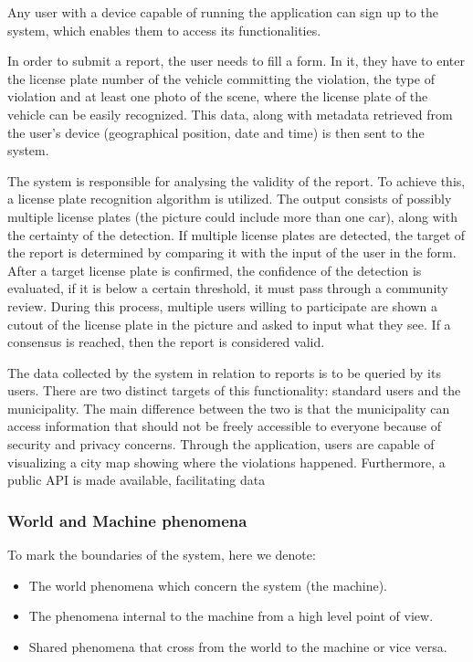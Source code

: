 Any user with a device capable of running the application can sign up to the system, which enables them to access its functionalities.

In order to submit a report, the user needs to fill a form. In it, they have to enter the license plate number of the vehicle committing the violation, the type of violation and at least one photo of the scene, where the license plate of the vehicle can be easily recognized. This data, along with metadata retrieved from the user's device (geographical position, date and time) is then sent to the system.

The system is responsible for analysing the validity of the report. To achieve this, a license plate recognition algorithm is utilized. The output consists of possibly multiple license plates (the picture could include more than one car), along with the certainty of the detection. If multiple license plates are detected, the target of the report is determined by comparing it with the input of the user in the form. After a target license plate is confirmed, the confidence of the detection is evaluated, if it is below a certain threshold, it must pass through a community review. During this process, multiple users willing to participate are shown a cutout of the license plate in the picture and asked to input what they see. If a consensus is reached, then the report is considered valid.

The data collected by the system in relation to reports is to be queried by its users. There are two distinct targets of this functionality: standard users and the municipality. The main difference between the two is that the municipality can access information that should not be freely accessible to everyone because of security and privacy concerns. Through the application, users are capable of visualizing a city map showing where the violations happened. Furthermore, a public API is made available, facilitating data 

\subsubsection{World and Machine phenomena}
To mark the boundaries of the system, here we denote:
    \begin{itemize}
        \item The world phenomena which concern the system (the machine).
        \item The phenomena internal to the machine from a high level point of view.
        \item Shared phenomena that cross from the world to the machine or vice versa.
    \end{itemize}

